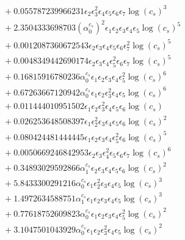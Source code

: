 \documentclass[10pt]{article}
\begin{document}
\begin{align*}
&{}  + 0.055787239966231 \epsilon_{2} \epsilon_{3}^{2} \epsilon_{4} \epsilon_{5} \epsilon_{6} \epsilon_{7} \log{\left(c_{s} \right)}^{3} \\
&{}  + 2.3504333698703 \left(\alpha_{0}^{c_s}\right)^{2} \epsilon_{1} \epsilon_{2} \epsilon_{3} \epsilon_{4} \epsilon_{5} \log{\left(c_{s} \right)}^{5} \\
&{}  + 0.0012087360672543 \epsilon_{2} \epsilon_{3} \epsilon_{4} \epsilon_{5} \epsilon_{6} \epsilon_{7}^{2} \log{\left(c_{s} \right)}^{5} \\
&{}  + 0.0048349442690174 \epsilon_{2} \epsilon_{3} \epsilon_{4} \epsilon_{5}^{2} \epsilon_{6} \epsilon_{7} \log{\left(c_{s} \right)}^{5} \\
&{}  + 0.16815916780236 \alpha_{0}^{c_s} \epsilon_{1} \epsilon_{2} \epsilon_{3} \epsilon_{4} \epsilon_{5}^{2} \log{\left(c_{s} \right)}^{6} \\
&{}  + 0.67263667120942 \alpha_{0}^{c_s} \epsilon_{1} \epsilon_{2} \epsilon_{3}^{2} \epsilon_{4} \epsilon_{5} \log{\left(c_{s} \right)}^{6} \\
&{}  + 0.011444010951502 \epsilon_{1} \epsilon_{2} \epsilon_{3}^{2} \epsilon_{4} \epsilon_{5} \epsilon_{6} \log{\left(c_{s} \right)} \\
&{}  + 0.026253648508397 \epsilon_{1} \epsilon_{2}^{2} \epsilon_{3} \epsilon_{4} \epsilon_{5} \epsilon_{6} \log{\left(c_{s} \right)}^{2} \\
&{}  + 0.080424481444445 \epsilon_{1} \epsilon_{2} \epsilon_{3} \epsilon_{4} \epsilon_{5}^{2} \epsilon_{6} \log{\left(c_{s} \right)}^{5} \\
&{}  + 0.0050669246842953 \epsilon_{2} \epsilon_{3} \epsilon_{4}^{2} \epsilon_{5} \epsilon_{6} \epsilon_{7} \log{\left(c_{s} \right)}^{6} \\
&{}  + 0.34893029592866 \alpha_{1}^{c_s} \epsilon_{2} \epsilon_{3} \epsilon_{4} \epsilon_{5} \epsilon_{6} \log{\left(c_{s} \right)}^{2} \\
&{}  + 5.8433300291216 \alpha_{0}^{c_s} \epsilon_{1} \epsilon_{2}^{2} \epsilon_{3} \epsilon_{4} \epsilon_{5} \log{\left(c_{s} \right)}^{3} \\
&{}  + 1.4972634588751 \alpha_{1}^{c_s} \epsilon_{1} \epsilon_{2} \epsilon_{3} \epsilon_{4} \epsilon_{5} \log{\left(c_{s} \right)}^{3} \\
&{}  + 0.77618752609823 \alpha_{0}^{c_s} \epsilon_{1} \epsilon_{2} \epsilon_{3} \epsilon_{4} \epsilon_{5}^{2} \log{\left(c_{s} \right)}^{2} \\
&{}  + 3.1047501043929 \alpha_{0}^{c_s} \epsilon_{1} \epsilon_{2} \epsilon_{3}^{2} \epsilon_{4} \epsilon_{5} \log{\left(c_{s} \right)}^{2} \\

\end{align*}
\end{document}

